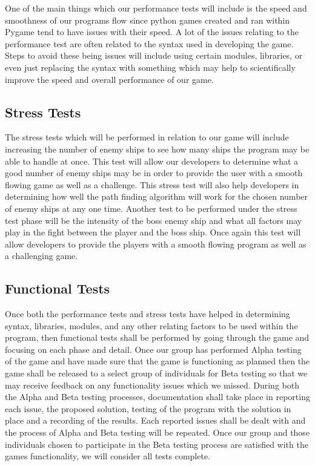     One of the main things which our performance tests will include
    is the speed and smoothness of our programs flow since python
    games created and ran within Pygame tend to have issues with
    their speed. A lot of the issues relating to the performance
    test are often related to the syntax used in developing the
    game. Steps to avoid these being issues will include using
    certain modules, libraries, or even just replacing the syntax
    with something which may help to scientifically improve the
    speed and overall performance of our game.

\subsection*{Stress Tests}
    The stress tests which will be performed in relation to our game
    will include increasing the number of enemy ships to see how
    many ships the program may be able to handle at once. This test
    will allow our developers to determine what a good number of
    enemy ships may be in order to provide the user with a smooth
    flowing game as well as a challenge. This stress test will also
    help developers in determining how well the path finding
    algorithm will work for the chosen number of enemy ships at any
    one time. Another test to be performed under the stress test
    phase will be the intensity of the boss enemy ship and what all
    factors may play in the fight between the player and the boss
    ship. Once again this test will allow developers to provide the
    players with a smooth flowing program as well as a challenging game.

\subsection*{Functional Tests}
    Once both the performance tests and stress tests have helped in
    determining syntax, libraries, modules, and any other relating
    factors to be used within the program, then functional tests
    shall be performed by going through the game and focusing on
    each phase and detail. Once our group has performed Alpha
    testing of the game and have made sure that the game is
    functioning as planned then the game shall be released to a
    select group of individuals for Beta testing so that we may
    receive feedback on any functionality issues which we missed.
    During both the Alpha and Beta testing processes, documentation
    shall take place in reporting each issue, the proposed solution,
    testing of the program with the solution in place and a
    recording of the results. Each reported issues shall be dealt
    with and the process of Alpha and Beta testing will be repeated.
    Once our group and those individuals chosen to participate in
    the Beta testing process are satisfied with the games
    functionality, we will consider all tests complete.
